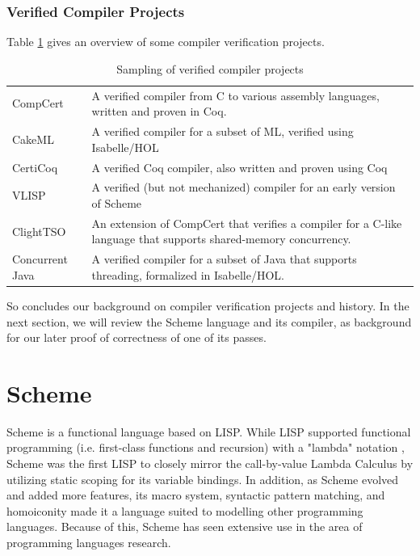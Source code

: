 \subsubsection{Verified Compiler Projects}\label{sxn:new_proofs}
Table \ref{tab:cc_projs} gives an overview of some compiler verification projects.
\begin{table}[]
    \centering
    \begin{tabularx}{\textwidth}{l|X}
         CompCert \cite{leroy2019compcert} & A verified compiler from C to various assembly languages, written and proven in Coq. \\
         CakeML \cite{kumar2014cakeml} & A verified compiler for a subset of ML, verified using Isabelle/HOL \cite{nipkow2002isabelle} \\
         CertiCoq \cite{anand2017certicoq} & A verified Coq compiler, also written and proven using Coq \\
         VLISP \cite{guttman_vlisp_1995} & A verified (but not mechanized) compiler for an early version of Scheme \\
         ClightTSO \cite{sevvcik2011relaxed} & An extension of CompCert that verifies a compiler for a C-like language that supports shared-memory concurrency. \\
         Concurrent Java \cite{lochbihler2010verifying} & A verified compiler for a subset of Java that supports threading, formalized in Isabelle/HOL.
    \end{tabularx}
    \caption{Sampling of verified compiler projects}
    \label{tab:cc_projs}
\end{table}

So concludes our background on compiler verification projects and history. In the next section, we will review the Scheme language and its compiler, as background for our later proof of correctness of one of its passes.

\section{Scheme}
Scheme is a functional language based on LISP. While LISP supported functional programming (i.e. first-class functions and recursion) with a "lambda" notation \cite{mccarthy1960recursive}, Scheme was the first LISP to closely mirror the call-by-value Lambda Calculus by utilizing static scoping for its variable bindings. In addition, as Scheme evolved and added more features, its macro system, syntactic pattern matching, and homoiconity made it a language suited to modelling other programming languages. Because of this, Scheme has seen extensive use in the area of programming languages research. 

